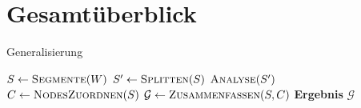 \documentclass[../main/thesis.tex]{subfiles}
\begin{document}
%				
%				
%				
%	
%	



\section{Gesamtüberblick}

\begin{algorithmhere}{Generalisierung}
\label{alg:Generalisierung}
\begin{algorithmic}
	\State $S \gets \textproc{Segmente}(W)$
	\State $S' \gets \textproc{Splitten}(S)$
	\State $\textproc{Analyse}(S')$
	\State $C \gets \textproc{NodesZuordnen}(S)$
	\State $\mathcal{G} \gets \textproc{Zusammenfassen}(S, C)$
	\State \textbf{Ergebnis} $\mathcal{G}$
\EndFunction
\end{algorithmic}
\end{algorithmhere}
\end{document}
